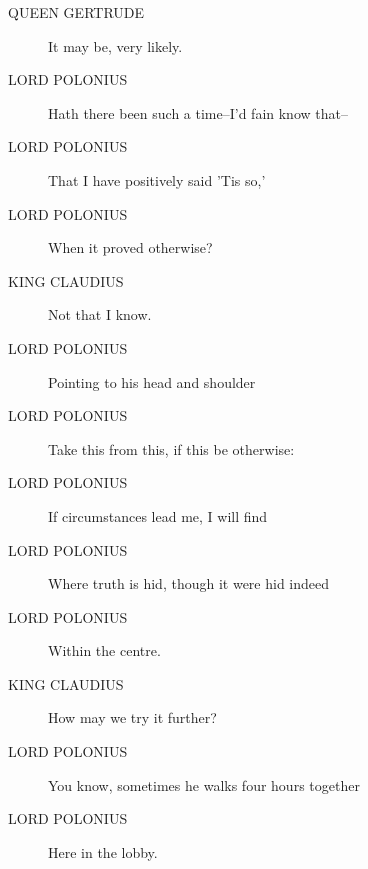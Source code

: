 \documentclass{article}
\begin{document}
\begin{description}
            
\item[QUEEN GERTRUDE] It may be, very likely.
\end{description}
          
\begin{description}
            
\item[LORD POLONIUS] Hath there been such a time--I'd fain know that--
\item[LORD POLONIUS] That I have positively said 'Tis so,'
\item[LORD POLONIUS] When it proved otherwise?
\end{description}
          
\begin{description}
            
\item[KING CLAUDIUS] Not that I know.
\end{description}
          
\begin{description}
            
\item[LORD POLONIUS] 
               Pointing to his head and shoulder
            
\item[LORD POLONIUS] Take this from this, if this be otherwise:
\item[LORD POLONIUS] If circumstances lead me, I will find
\item[LORD POLONIUS] Where truth is hid, though it were hid indeed
\item[LORD POLONIUS] Within the centre.
\end{description}
          
\begin{description}
            
\item[KING CLAUDIUS] How may we try it further?
\end{description}
          
\begin{description}
            
\item[LORD POLONIUS] You know, sometimes he walks four hours together
\item[LORD POLONIUS] Here in the lobby.
\end{description}
          
\end{document}
